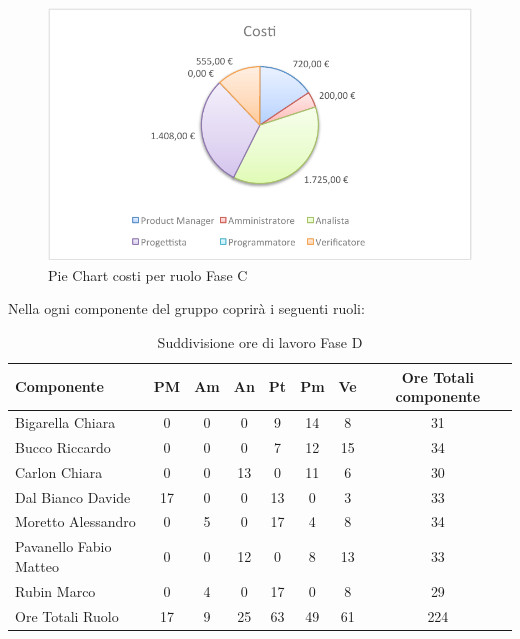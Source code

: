 				\begin{figure}[H]\centering
					\includegraphics[width=\textwidth]{PianoDiProgetto/Pics/ChartTotCostiFaseC.pdf}
					\caption{Pie Chart costi per ruolo Fase C}
				\end{figure}
				Nella  ogni componente del gruppo \groupname{} coprirà i seguenti ruoli:
				\begin{table}[H]
					\begin{center}
						\begin{tabular}{| l | c | c | c | c | c | c | c |}
							\hline
							Componente 				& PM	& Am 	& An 	& Pt 		& Pm 	& Ve 	& Ore Totali componente \\ \hline
							
							Bigarella Chiara 			& 0		& 0		& 0		& 9 		& 14 		& 8 		& 31 \\
							Bucco Riccardo 			& 0		& 0		& 0		& 7 		& 12		& 15 		& 34 \\
							Carlon Chiara	 			& 0		& 0		& 13 		& 0		& 11 		& 6 		& 30 \\
							Dal Bianco Davide 			& 17 		& 0		& 0		& 13 		& 0		& 3 		& 33 \\
							Moretto Alessandro 			& 0		& 5 		& 0		& 17 		& 4 		& 8 		& 34 \\
							Pavanello Fabio Matteo	 	& 0		& 0		& 12 		& 0		& 8 		& 13 		& 33 \\
							Rubin Marco				& 0		& 4 		& 0		& 17 		& 0		& 8 		& 29 \\ \hline \hline
							
							Ore Totali Ruolo 			& 17 		& 9 		& 25 		& 63 		& 49 		& 61 		& 224	\\ \hline
						\end{tabular}
					\end{center}
					\caption{Suddivisione ore di lavoro Fase D}
				\end{table}
